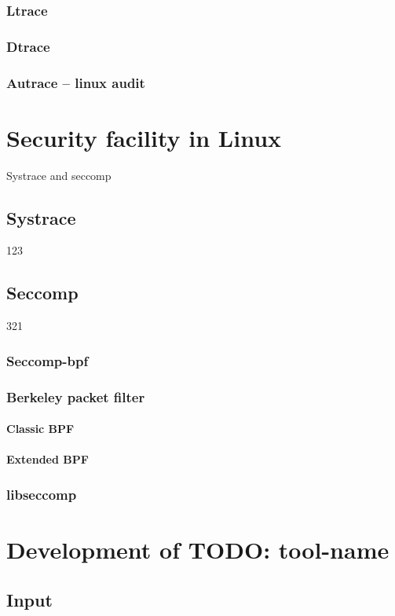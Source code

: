 \subsection{Ltrace}
\subsection{Dtrace}
\subsection{Autrace -- linux audit}

\chapter{Security facility in Linux}
Systrace and seccomp\cite{Pravidla}
\section{Systrace}
123

\section{Seccomp}
321
\subsection{Seccomp-bpf}

\subsection{Berkeley packet filter}
\subsubsection{Classic BPF}
\subsubsection{Extended BPF}

\subsection{libseccomp}


\chapter{Development of TODO: tool-name}
\section{Input}
